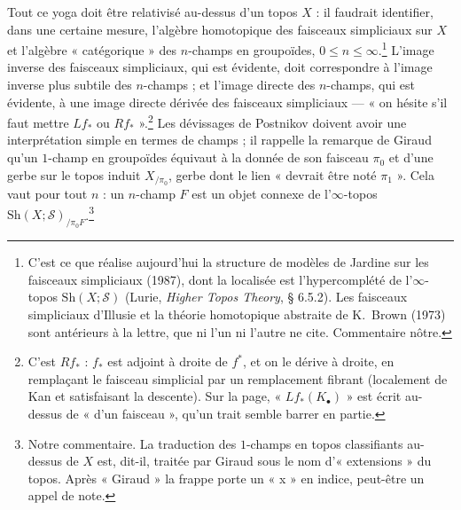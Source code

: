 \documentclass[11pt,a4paper]{article}
\begin{document}
Tout ce yoga doit être relativisé au-dessus d'un topos $X$ : il faudrait
identifier, dans une certaine mesure, l'algèbre homotopique des faisceaux
simpliciaux sur $X$ et l'algèbre « catégorique » des $n$-champs en
groupoïdes, $0 \leqslant n \leqslant \infty$.\footnote{C'est ce que
réalise aujourd'hui la structure de modèles de Jardine sur les faisceaux
simpliciaux (1987), dont la localisée est l'hypercomplété de
l'$\infty$-topos $\mathrm{Sh}(X;\mathcal{S})$ (Lurie, \emph{Higher Topos
Theory}, § 6.5.2). Les faisceaux simpliciaux d'Illusie et la théorie
homotopique abstraite de K.~Brown (1973) sont antérieurs à la lettre, que ni
l'un ni l'autre ne cite. Commentaire nôtre.} L'image inverse des faisceaux
simpliciaux, qui est évidente, doit correspondre à l'image inverse plus
subtile des $n$-champs ; et l'image directe des $n$-champs, qui est évidente,
à une image directe dérivée des faisceaux simpliciaux --- « on hésite s'il
faut mettre $Lf_*$ ou $Rf_*$ ».\footnote{C'est $Rf_*$ : $f_*$ est adjoint
à droite de $f^*$, et on le dérive à droite, en remplaçant le faisceau
simplicial par un remplacement fibrant (localement de Kan et satisfaisant
la descente). Sur la page, « $Lf_*(K_\bullet)$ » est écrit au-dessus de
« d'un faisceau », qu'un trait semble barrer en partie.} Les dévissages de
Postnikov doivent avoir une interprétation simple en termes de champs ; il
rappelle la remarque de Giraud qu'un $1$-champ en groupoïdes équivaut à la
donnée de son faisceau $\pi_0$ et d'une gerbe sur le topos induit
$X_{/\pi_0}$, gerbe dont le lien « devrait être noté $\pi_1$ ». Cela vaut
pour tout $n$ : un $n$-champ $F$ est un objet connexe de l'$\infty$-topos
$\mathrm{Sh}(X;\mathcal{S})_{/\pi_0 F}$.\footnote{Notre commentaire. La
traduction des $1$-champs en topos classifiants au-dessus de $X$ est, dit-il,
traitée par Giraud sous le nom d'« extensions » du topos. Après « Giraud »
la frappe porte un « x » en indice, peut-être un appel de note.}
\end{document}
